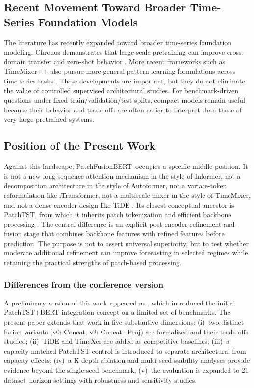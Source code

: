\documentclass{ieeeaccess}
\newcommand{\model}{PatchFusionBERT\xspace}
\begin{document}
\subsection{Recent Movement Toward Broader Time-Series Foundation Models}
The literature has recently expanded toward broader time-series foundation modeling.
Chronos demonstrates that large-scale pretraining can improve cross-domain transfer
and zero-shot behavior \cite{ansari2024chronos}. More recent frameworks such as
TimeMixer++ also pursue more general pattern-learning formulations across time-series
tasks \cite{timemixerpp2025}. These developments are important, but they do not
eliminate the value of controlled supervised architectural studies. For
benchmark-driven questions under fixed train/validation/test splits, compact models
remain useful because their behavior and trade-offs are often easier to interpret than
those of very large pretrained systems.

\subsection{Position of the Present Work}
Against this landscape, \model\ occupies a specific middle position. It is not a new
long-sequence attention mechanism in the style of Informer, not a decomposition
architecture in the style of Autoformer, not a variate-token reformulation like
iTransformer, not a multiscale mixer in the style of TimeMixer, and not a
dense-encoder design like TiDE
\cite{zhou2021informer,wu2021autoformer,liu2024itransformer,wang2024timemixer,das2023tide}.
Its closest conceptual ancestor is PatchTST, from which it inherits patch tokenization
and efficient backbone processing \cite{nie2023patchtst}. The central difference is an
explicit post-encoder refinement-and-fusion stage that combines backbone features with
refined features before prediction. The purpose is not to assert universal superiority,
but to test whether moderate additional refinement can improve forecasting in selected
regimes while retaining the practical strengths of patch-based processing.

\subsubsection*{Differences from the conference version}
A preliminary version of this work appeared as \cite{ahmad2024icamcs_patchbert},
which introduced the initial PatchTST+BERT integration concept on a limited set of
benchmarks. The present paper extends that work in five substantive dimensions:
(i)~two distinct fusion variants (v0: Concat; v2: Concat+Proj) are formalized and
their trade-offs studied; (ii)~TiDE and TimeXer are added as competitive baselines;
(iii)~a capacity-matched PatchTST control is introduced to separate architectural
from capacity effects; (iv)~a K-depth ablation and multi-seed stability analyses
provide evidence beyond the single-seed benchmark; (v)~the evaluation is expanded
to 21 dataset--horizon settings with robustness and sensitivity studies.
\end{document}
